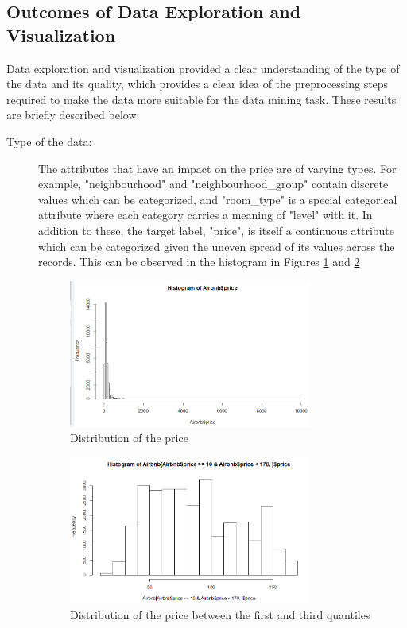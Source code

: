 \documentclass{sig-alternate}
\begin{document}
	\subsection{Outcomes of Data Exploration and Visualization}
	Data exploration and visualization provided a clear understanding of the type of the data and its quality, which provides a clear idea of the preprocessing steps required to make the data more suitable for the data mining task. These results are briefly described below:
	\begin{description}
		\item[Type of the data:] The attributes that have an impact on the price are of varying types. For example, "neighbourhood" and "neighbourhood\_group" contain discrete values which can be categorized, and "room\_type" is a special categorical attribute where each category carries a meaning of "level" with it. In addition to these, the target label, "price", is itself a continuous attribute which can be categorized given the uneven spread of its values across the records. This can be observed in the histogram in Figures \ref{price_hist_1} and \ref{price_hist_2}
		\begin{figure}[ht]
			\includegraphics[width=8cm]{price_hist_1.png}
			\centering
			\caption{Distribution of the price}
			\label{price_hist_1}
		\end{figure}
		\begin{figure}[ht]
			\includegraphics[width=8cm]{price_hist_2.png}
			\centering
			\caption{Distribution of the price between the first and third quantiles}
			\label{price_hist_2}

\end{figure}
\end{description}
\end{document}
